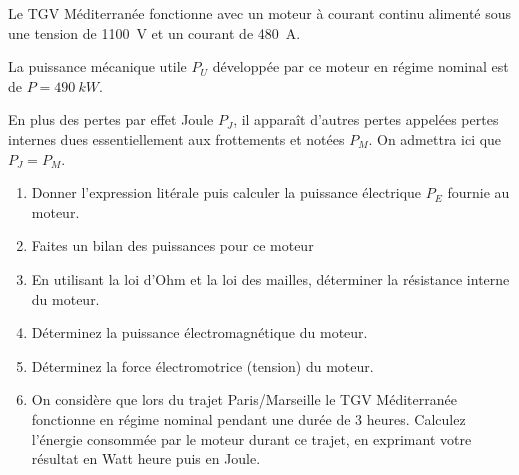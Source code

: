 \documentclass[a4paper,12pt]{article}
\begin{document}
Le  TGV  Méditerranée  fonctionne  avec  un  moteur  à  courant  continu  alimenté  sous  une  tension  de \SI{1100}{V} et  un courant de \SI{480}{A}.

La puissance mécanique utile $P_U$ développée par ce moteur en régime nominal est de $P= \SI{490}{kW}$.

En plus des pertes par effet Joule $P_J$, il apparaît d’autres pertes appelées pertes internes dues essentiellement aux frottements et notées $P_M$.
On admettra ici que $P_J = P_M$.

\begin{enumerate}
  \item{} Donner l'expression litérale puis calculer la puissance électrique $P_E$ fournie au moteur.
  \item{} Faites un bilan des puissances pour ce moteur
  \item{} En utilisant la loi d'Ohm et la loi des mailles, déterminer la résistance interne du moteur.
  \item{}Déterminez la puissance électromagnétique du moteur.
  \item{}Déterminez la force électromotrice (tension) du moteur.
  \item{}On considère que lors du trajet Paris/Marseille le TGV Méditerranée fonctionne en régime nominal pendant une durée de 3 heures. Calculez l’énergie consommée par le moteur durant ce trajet, en exprimant votre résultat en Watt heure puis en Joule.

\end{enumerate}
%
%
%
%
\large\bfseries
%
%
%
%
\end{document}

